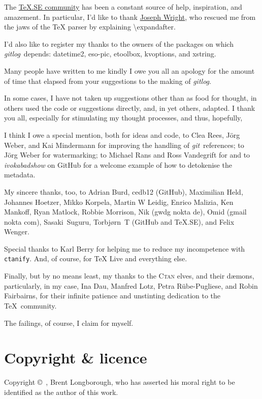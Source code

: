 \documentclass[a4paper,12pt,twoside,openany]{memoir}
\newcommand{\sfit}[1]{\textit{#1}}
\newcommand{\git}{\sfit{git}}
\newcommand{\tpname}{\sfit{gitlog}}
\begin{document}
The \href{http://tex.stackexchange.com}{\TeX.SE community}
has been a constant source of help, inspiration, and amazement.
In particular, I'd like to thank
\href{http://tex.stackexchange.com/users/73/joseph-wright}{Joseph Wright},
who rescued me from the jaws of the TeX parser by explaining
\textbackslash expandafter.

I'd also like to register my thanks to the owners of the packages on which
\tpname\ depends: datetime2, eso-pic, etoolbox, kvoptions, and xstring.

Many people have written to me kindly
I owe you all an apology for the amount of time that elapsed
from your suggestions to the making of \tpname.

In some cases, I have not taken up suggestions other than as food for thought,
in others used the code or suggestions directly, and,
in yet others, adapted.
I thank you all, especially for stimulating my thought processes,
and thus, hopefully,

I think I owe a special mention, both for ideas and code,
to Clea Rees, Jörg Weber, and Kai Mindermann
for improving the handling of \git\ references;
to Jörg Weber for watermarking;
to Michael Rans and Ross Vandegrift for
and to \sfit{ivokabadshow} on GitHub 
for a welcome example of how to detokenise the metadata.

My sincere thanks, too, to
Adrian Burd,
cedb12 (GitHub),
Maximilian Held,
Johannes Hoetzer,
Mikko Korpela,
Martin W Leidig,
Enrico Malizia,
Ken Mankoff,
Ryan Matlock,
Robbie Morrison,
Nik (gwdg nokta de),
Omid (gmail nokta com),
Sasaki~Suguru,
Tor\-bjørn~T (GitHub and TeX.SE),
and
Felix Wenger.

Special thanks to Karl Berry for helping me to
reduce my incompetence with \texttt{ctanify}.
And, of course, for \TeX{} Live and everything else.

Finally, but by no means least,
my thanks to the \textsc{Ctan} elves, and their dæmons,
particularly, in my case,
Ina Dau,
Manfred Lotz, 
Petra Rübe-Pugliese,
and 
Robin Fairbairns, 
for their infinite patience and unstinting
dedication to the \TeX\ community.

The failings, of course, I claim for myself.

\clearpage
\section{Copyright \& licence}
Copyright \copyright\ , Brent Longborough,
who has asserted his moral right
to be identified as the author of this work.
\end{document}
